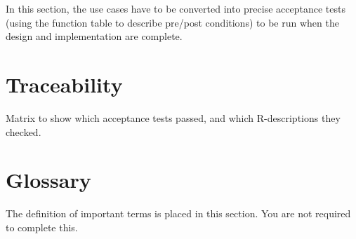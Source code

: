 \documentclass[fontsize=12pt,paper=letter,twoside]{scrartcl}
\begin{document}
In this section, the use cases have to be converted into precise acceptance tests (using the function table to describe pre/post conditions) to be run when the design and implementation are complete.

\section{Traceability}

Matrix to show which acceptance tests passed, and which R-descriptions they checked.


\section{Glossary}

The definition of important terms is placed in this section. You are not required to complete this.
\newpage



\newpage
\appendix 




\end{document}
